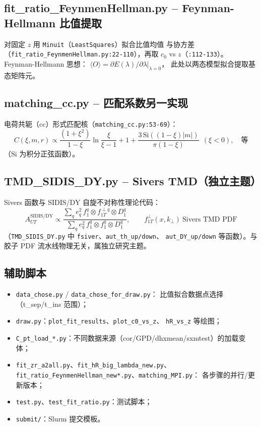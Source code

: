 \documentclass[UTF8]{ctexart}
\begin{document}
\subsection{fit\_ratio\_FeynmenHellman.py -- Feynman-Hellmann 比值提取}

对固定 $z$ 用 \texttt{Minuit}（\texttt{LeastSquares}）拟合比值均值
与协方差（\texttt{fit\_ratio\_FeynmenHellman.py:22-110}），再取
$c_0$ vs $z$（\texttt{:112-133}）。Feynman-Hellmann 思想：
$\langle O\rangle = \partial E(\lambda)/\partial\lambda|_{\lambda=0}$，
此处以两态模型拟合提取基态矩阵元。

\subsection{matching\_cc.py -- 匹配系数另一实现}

电荷共轭（cc）形式匹配核（\texttt{matching\_cc.py:53-69}）：
\begin{equation}
  C(\xi,m,r)\propto \frac{(1+\xi^2)}{1-\xi}\ln\frac{\xi}{\xi-1}
  + 1 + \frac{3\,\mathrm{Si}((1-\xi)|m|)}{\pi(1-\xi)}
  \ \ (\xi<0), \quad \text{等}
\end{equation}
（$\mathrm{Si}$ 为积分正弦函数）。

\subsection{TMD\_SIDIS\_DY.py -- Sivers TMD（独立主题）}

Sivers 函数与 SIDIS/DY 自旋不对称性理论代码：
\begin{equation}
  A_{UT}^{\mathrm{SIDIS/DY}} \propto \frac{
  \sum_q e_q^2\, f_1^q \otimes f_{1T}^{\perp q} \otimes D_1^q}{
  \sum_q e_q^2\, f_1^q \otimes f_1^q \otimes D_1^q},\qquad
  f_{1T}^{\perp}(x,k_\perp) \ \text{Sivers TMD PDF}
\end{equation}
（\texttt{TMD\_SIDIS\_DY.py} 中 \texttt{fsiver}、\texttt{aut\_th\_up/down}、
\texttt{aut\_DY\_up/down} 等函数）。与胶子 PDF 流水线物理无关，属独立研究主题。

\subsection{辅助脚本}

\begin{itemize}
  \item \texttt{data\_chose.py} / \texttt{data\_chose\_for\_draw.py}：
        比值拟合数据点选择（t\_sep/t\_ins 范围）；
  \item \texttt{draw.py}：\texttt{plot\_fit\_results}、\texttt{plot\_c0\_vs\_z}、
        \texttt{hR\_vs\_z} 等绘图；
  \item \texttt{C\_pt\_load\_*.py}：不同数据来源（cor/GPD/dhxmean/sxmtest）的加载变体；
  \item \texttt{fit\_zr\_a2all.py}、\texttt{fit\_hR\_big\_lambda\_new.py}、
        \texttt{fit\_ratio\_FeynmenHellman\_new*.py}、\texttt{matching\_MPI.py}：
        各步骤的并行/更新版本；
  \item \texttt{test.py}、\texttt{test\_fit\_ratio.py}：测试脚本；
  \item \texttt{submit/}：Slurm 提交模板。
\end{itemize}
\end{document}
